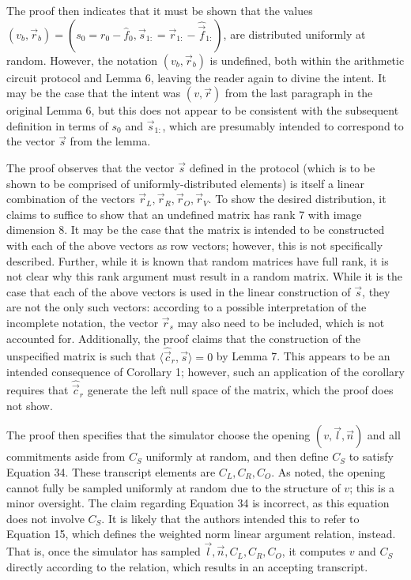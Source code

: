 \documentclass{article}
\begin{document}
The proof then indicates that it must be shown that the values $(v_b, \vec{r}_b) = (s_0 = r_0 - \hat{f}_0, \vec{s}_{1:} = \vec{r}_{1:} - \hat{\vec{f}}_{1:})$, are distributed uniformly at random.
However, the notation $(v_b, \vec{r}_b)$ is undefined, both within the arithmetic circuit protocol and Lemma 6, leaving the reader again to divine the intent.
It may be the case that the intent was $(v, \vec{r})$ from the last paragraph in the original Lemma 6, but this does not appear to be consistent with the subsequent definition in terms of $s_0$ and $\vec{s}_{1:}$, which are presumably intended to correspond to the vector $\vec{s}$ from the lemma.

The proof observes that the vector $\vec{s}$ defined in the protocol (which is to be shown to be comprised of uniformly-distributed elements) is itself a linear combination of the vectors $\vec{r}_L, \vec{r}_R, \vec{r}_O, \vec{r}_V$.
To show the desired distribution, it claims to suffice to show that an undefined matrix has rank 7 with image dimension 8.
It may be the case that the matrix is intended to be constructed with each of the above vectors as row vectors; however, this is not specifically described.
Further, while it is known that random matrices have full rank, it is not clear why this rank argument must result in a random matrix.
While it is the case that each of the above vectors is used in the linear construction of $\vec{s}$, they are not the only such vectors: according to a possible interpretation of the incomplete notation, the vector $\vec{r}_s$ may also need to be included, which is not accounted for.
Additionally, the proof claims that the construction of the unspecified matrix is such that $\langle \hat{\vec{c}}_r, \vec{s} \rangle = 0$ by Lemma 7.
This appears to be an intended consequence of Corollary 1; however, such an application of the corollary requires that $\hat{\vec{c}}_r$ generate the left null space of the matrix, which the proof does not show.

The proof then specifies that the simulator choose the opening $(v, \vec{l}, \vec{n})$ and all commitments aside from $C_S$ uniformly at random, and then define $C_S$ to satisfy Equation 34.
These transcript elements are $C_L, C_R, C_O$.
As noted, the opening cannot fully be sampled uniformly at random due to the structure of $v$; this is a minor oversight.
The claim regarding Equation 34 is incorrect, as this equation does not involve $C_S$.
It is likely that the authors intended this to refer to Equation 15, which defines the weighted norm linear argument relation, instead.
That is, once the simulator has sampled $\vec{l}, \vec{n}, C_L, C_R, C_O$, it computes $v$ and $C_S$ directly according to the relation, which results in an accepting transcript.
\end{document}
